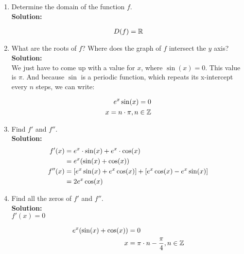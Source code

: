 \documentclass[a4paper]{article}
\begin{document}
\begin{enumerate}
\begin{enumerate}
	\item Determine the domain of the function $f$.\\
	\textbf{Solution:}\
	
\begin{align}
	D(f) = \mathbb{R}\notag
\end{align}	
	
	
	\item What are the roots of $f$? Where does the graph of $f$ intersect the $y$ axis?\\
	\textbf{Solution:}\\	
	
We just have to come up with a value for $x$, where $\sin(x) = 0$. This value is $\pi$. And because $\sin$ is a periodic function, which repeats its x-intercept every $n$ steps, we can write:

\begin{align}
	e^x\sin(x) = 0 \notag\\
	x = n \cdot \pi , n \in \mathbb{Z}\notag
\end{align}	
	
	
	\item Find $f'$ and $f''$.\\
	\textbf{Solution:}\\
	
\begin{align}
	f'(x) &= e^x \cdot \sin(x) + e^x \cdot \cos(x)\notag\\
	&= e^x(\sin(x) + \cos(x))\notag\\
	f''(x) &= \left[ e^x\sin(x) + e^x\cos(x) \right] + \left[ e^x\cos(x) - e^x\sin(x) \right]\notag\\
	&= 2e^x\cos(x)\notag
\end{align}		
	
	
	
	
	\item Find all the zeros of $f'$ and $f''$.\\
	\textbf{Solution:}\\
	
$f'(x) = 0$	
		
\begin{align}
	e^x(\sin(x) + \cos(x)) &= 0\notag\\
	x &= \pi \cdot n - \frac{\pi}{4}, n \in \mathbb{Z}\notag
\end{align}				


\end{enumerate}
\end{enumerate}
\end{document}
